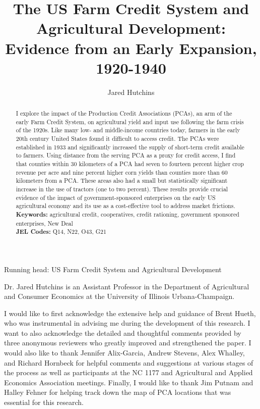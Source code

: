 \documentclass[12pt]{article}
\begin{document}
\title{The US Farm Credit System and Agricultural Development: Evidence from an Early Expansion, 1920-1940}
\author{Jared Hutchins}
\date{}
\maketitle
\begin{abstract}
    I explore the impact of the Production Credit Associations (PCAs), an arm of the early Farm Credit System, on agricultural yield and input use following the farm crisis of the 1920s. Like many low- and middle-income countries today, farmers in the early 20th century United States found it difficult to access credit. The PCAs were established in 1933 and significantly increased the supply of short-term credit available to farmers. 
    Using distance from the serving PCA as a proxy for credit access, I find that counties within 30 kilometers of a PCA had seven to fourteen percent higher crop revenue per acre and nine percent higher corn yields than counties more than 60 kilometers from a PCA. 
    These areas also had a small but statistically significant increase in the use of tractors (one to two percent). 
    These results provide crucial evidence of the impact of government-sponsored enterprises on the early US agricultural economy and its use as a cost-effective tool to address market frictions.\\
    \textbf{Keywords:} agricultural credit, cooperatives, credit rationing, government sponsored enterprises, New Deal \\
    \textbf{JEL Codes:} Q14, N22, O43, G21

\end{abstract}
\begin{center}
Running head: US Farm Credit System and Agricultural Development
\end{center}

Dr. Jared Hutchins is an Assistant Professor in the Department of Agricultural and Consumer Economics at the University of Illinois Urbana-Champaign.

I would like to first acknowledge the extensive help and guidance of Brent Hueth, who was instrumental in advising me during the development of this research. I want to also acknowledge the detailed and thoughtful comments provided by three anonymous reviewers who greatly improved and strengthened the paper. I would also like to thank Jennifer Alix-Garcia, Andrew Stevens, Alex Whalley, and Richard Hornbeck for helpful comments and suggestions at various stages of the process as well as participants at the NC 1177 and Agricultural and Applied Economics Association meetings. Finally, I would like to thank Jim Putnam and Halley Fehner for helping track down the map of PCA locations that was essential for this research.
\end{document}
